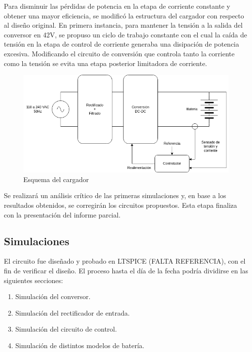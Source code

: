 Para disminuir las pérdidas de potencia en la etapa de corriente constante y obtener una mayor eficiencia, se modificó la estructura del cargador con respecto al diseño original. 
En primera instancia, para mantener la tensión a la salida del conversor en 42V, se propuso un ciclo de trabajo constante 
con el cual la caída de tensión en la etapa de control de corriente generaba una disipación de potencia excesiva.
Modificando el circuito de conversión que controla tanto la corriente como la tensión se evita una etapa posterior limitadora de corriente.

\begin{figure}
    \centering
    \includegraphics[width=\textwidth]{images/esquema_cargador_v2.png}
    \caption{Esquema del cargador}
    \label{fig:esquema_cargador}
\end{figure}

Se realizará un análisis crítico de las primeras simulaciones y, en base a los resultados obtenidos, 
se corregirán los circuitos propuestos. 
Esta etapa finaliza con la presentación del informe parcial. 

\subsection{Simulaciones}
El circuito fue diseñado y probado en LTSPICE (FALTA REFERENCIA), con el fin de verificar el diseño.
El proceso hasta el día de la fecha podría dividirse en las siguientes secciones:
\begin{enumerate}
    \item Simulación del conversor.
    \item Simulación del rectificador de entrada.
    \item Simulación del circuito de control.
    \item Simulación de distintos modelos de batería.
\end{enumerate}

